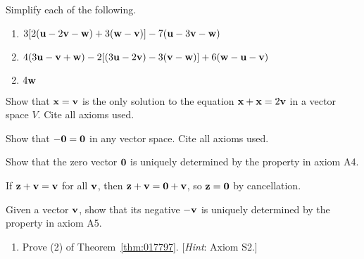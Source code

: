 \begin{multicols}{2}
\begin{ex}
Simplify each of the following.

\begin{enumerate}[label={\alph*.}]
\item $3[2(\textbf{u} - 2\textbf{v} - \textbf{w}) + 3(\textbf{w} - \textbf{v})] - 7(\textbf{u} - 3\textbf{v} - \textbf{w})$

\item $4(3\vect{u} - \vect{v} + \vect{w}) - 2[(3\vect{u} - 2\vect{v}) - 3(\vect{v} - \vect{w})] \newline + 6(\vect{w} - \vect{u} - \vect{v})$

\end{enumerate}
\begin{sol}
\begin{enumerate}[label={\alph*.}]
\setcounter{enumi}{1}
\item  $4\textbf{w}$

\end{enumerate}
\end{sol}
\end{ex}

\begin{ex}
Show that $\textbf{x} = \textbf{v}$ is the only solution to the equation $\textbf{x} + \textbf{x} = 2\textbf{v}$ in a vector space $V$. Cite all axioms used.
\end{ex}

\begin{ex}
Show that $-\textbf{0} = \textbf{0}$ in any vector space. Cite all axioms used.
\end{ex}

\begin{ex}
\label{ex:6_1_10}
Show that the zero vector $\textbf{0}$ is uniquely determined by the property in axiom A4.

\begin{sol}
If $\textbf{z} + \textbf{v} = \textbf{v}$ for all $\textbf{v}$, then $\textbf{z} + \textbf{v} = \textbf{0} + \textbf{v}$, so $\textbf{z} = \textbf{0}$ by cancellation.
\end{sol}
\end{ex}

\begin{ex}
\label{ex:6_1_11}
Given a vector $\textbf{v}$, show that its negative $-\textbf{v}$ is uniquely determined by the property in axiom A5.
\end{ex}

\begin{ex}
\label{ex:6_1_12}
\begin{enumerate}[label={\alph*.}]
\item Prove (2) of Theorem~\ref{thm:017797}. [\textit{Hint}: Axiom S2.]


\end{enumerate}
\end{ex}
\end{multicols}
